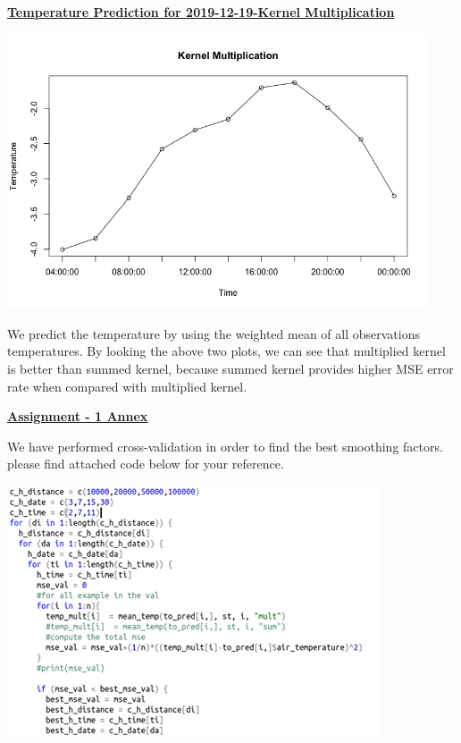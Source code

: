 \documentclass[a4paper,10pt]{article}
\begin{document}
\par 
\vspace{0.5cm}
\textbf{\underline{Temperature Prediction for 2019-12-19-Kernel Multiplication}}
\begin{center}
  \includegraphics[width=125mm,scale=0.10]{Temp_2_Measured.png}
\end{center}
We predict the temperature by using the weighted mean of all observations temperatures. By looking the above two plots,
we can see that multiplied kernel is better than summed kernel, because summed kernel provides higher MSE error rate when
compared with multiplied kernel.
\par
\vspace{0.5cm}
\textbf{\underline{Assignment - 1 Annex}}
\par
We have performed cross-validation in order to find the best smoothing factors. please find attached code 
below for your reference. \par
\begin{center}
  \includegraphics{Cross_Validation.png}
\end{center}
\end{document}
